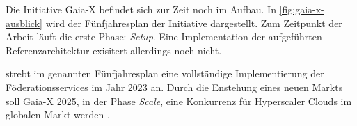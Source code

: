 Die Initiative Gaia-X befindet sich zur Zeit noch im Aufbau.
In \ref{fig:gaia-x-ausblick} wird der Fünfjahresplan der Initiative dargestellt.
Zum Zeitpunkt der Arbeit läuft die erste Phase: \emph{Setup}.
Eine Implementation der aufgeführten Referenzarchitektur exisitert allerdings noch nicht.

\citeauthor{Bonfiglio2021} strebt im genannten Fünfjahresplan eine vollständige Implementierung der Föderationsservices
im Jahr 2023 an.
Durch die Enstehung eines neuen Markts soll Gaia-X 2025, in der Phase \emph{Scale},
eine Konkurrenz für Hyperscaler Clouds im globalen Markt werden \cite{Bonfiglio2021}.



